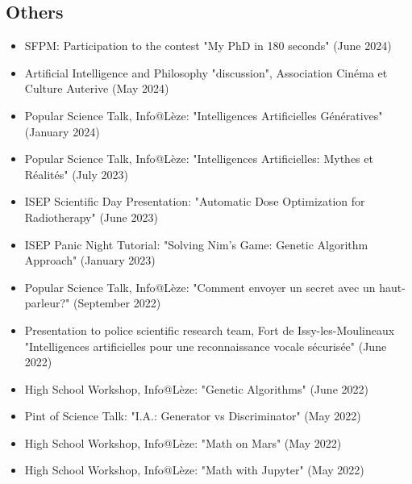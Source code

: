 \subsection*{Others}
\begin{itemize}
	\item SFPM: Participation to the contest "My PhD in 180 seconds" (June 2024)
	\item Artificial Intelligence and Philosophy "discussion", Association Cinéma et Culture Auterive (May 2024) 
	\item Popular Science Talk, Info@Lèze: "Intelligences Artificielles Génératives" (January 2024)
	\item Popular Science Talk, Info@Lèze: "Intelligences Artificielles: Mythes et Réalités" (July 2023)	\item ISEP Scientific Day Presentation: "Automatic Dose Optimization for Radiotherapy" (June 2023)
	\item ISEP Panic Night Tutorial: "Solving Nim's Game: Genetic Algorithm Approach" (January 2023)
	\item Popular Science Talk, Info@Lèze: "Comment envoyer un secret avec un haut-parleur?" (September 2022)
	\item Presentation to police scientific research team, Fort de Issy-les-Moulineaux "Intelligences artificielles pour une reconnaissance vocale sécurisée" (June 2022)
	\item High School Workshop, Info@Lèze: "Genetic Algorithms" (June 2022)
	\item Pint of Science Talk: "I.A.: Generator vs Discriminator" (May 2022)
	\item High School Workshop, Info@Lèze: "Math on Mars" (May 2022)
	\item High School Workshop, Info@Lèze: "Math with Jupyter" (May 2022)
\end{itemize}
